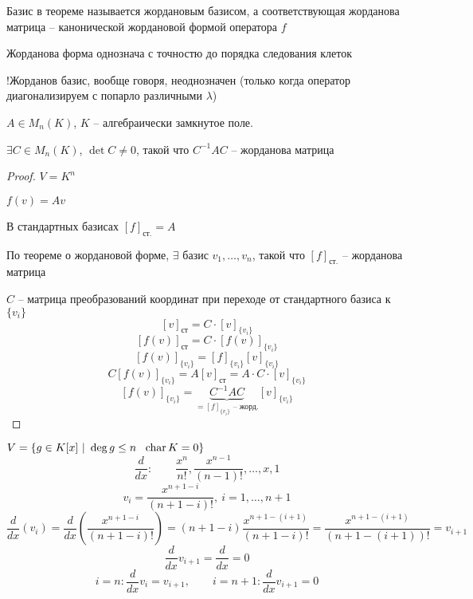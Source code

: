     \begin{definition}
        Базис в теореме называется жордановым базисом, а соответствующая жорданова матрица -- канонической жордановой формой оператора $f$
        \par Жорданова форма однознача с точностю до порядка следования клеток
        \par !Жорданов базис, вообще говоря, неоднозначен (только когда оператор диагонализируем с попарло различными $\lambda$)
    \end{definition}

    \begin{corollary}
        $A \in M_n(K)$, $K$ -- алгебраически замкнутое поле.
        \par $\exists C \in M_n(K)$, $\det C \not= 0$, такой что $C^{-1}AC$ -- жорданова матрица
    \end{corollary}
    \begin{proof}
        $V = K^n$
        \par $f(v) = Av$
        \par В стандартных базисах $[f]_{\text{ст.}} = A$
        \par По теореме о жордановой форме, $\exists$ базис $v_1, \dots, v_n$, такой что $[f]_{\text{ст.}}$ -- жорданова матрица
        \par $C$ -- матрица преобразований координат при переходе от стандартного базиса к $\{v_i\}$
        \[
            [v]_{\text{ст}} = C \cdot [v]_{\{v_i\}}    
        \]
        \[
            [f(v)]_{\text{ст}} = C \cdot [f(v)]_{\{v_i\}}    
        \]
        \[
            [f(v)]_{\{v_i\}} = [f]_{\{v_i\}} [v]_{\{v_i\}}
        \]
        \[
            C[f(v)]_{\{v_i\}}  = A[v]_{\text{ст}} = A \cdot C \cdot [v]_{\{v_i\}}   
        \]
        \[
            [f(v)]_{\{v_i\}} = \underbrace{C^{-1}AC}_{= [f]_{\{v_i\}} \text{ -- жорд.}} [v]_{\{v_i\}}
        \]
    \end{proof}

    \begin{illustration*}
        $V = \{g \in K[x] \ | \ \deg g \le n \ \ \Char K = 0\}$
        \[
            \frac{d}{dx} : \quad \quad \frac{x^n}{n!}, \frac{x^{n-1}}{(n-1)!}, \dots, x, 1  
        \]
        \[
            v_i = \frac{x^{n+1-i}}{(n+1-i)!}, \ i = 1, \dots, n+1   
        \]
        \[
            \frac{d}{dx}(v_i) = \frac{d}{dx}(\frac{x^{n+1-i}}{(n+1-i)!}) = (n+1-i) \frac{x^{n+1-(i+1)}}{(n+1-i)!} = \frac{x^{n+1-(i+1)}}{(n+1-(i+1))!} = v_{i+1}
        \]
        \[
            \frac{d}{dx}v_{i+1} = \frac{d}{dx} = 0    
        \]
        \[
            i = n : \frac{d}{dx}v_i = v_{i+1}, \quad \quad i = n+1 : \frac{d}{dx} v_{i+1} = 0
        \]
    \end{illustration*}

